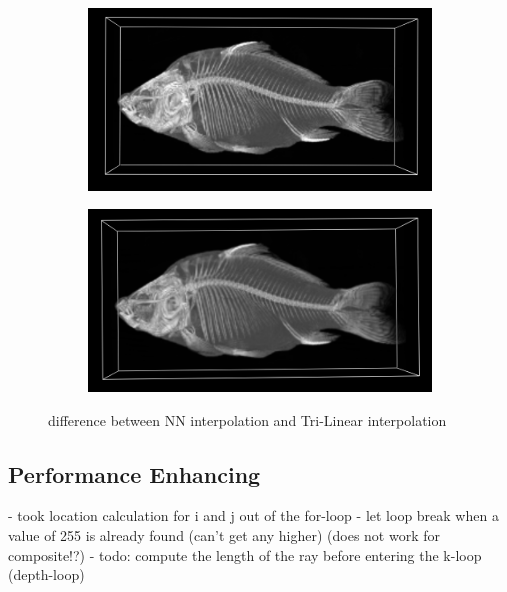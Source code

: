 \begin{figure}[h!]
    \centering
    \captionsetup{justification=centering,margin=0.5cm}
    \begin{subfigure}[t]{0.48\textwidth}
        \includegraphics[width=\textwidth]{img/fish_NN.png}
        \caption{ }
    \end{subfigure}
    \begin{subfigure}[t]{0.48\textwidth}
        \includegraphics[width=\textwidth]{img/fish_TriLin.png}
        \caption{ }
    \end{subfigure}
    \caption{difference between NN interpolation and Tri-Linear interpolation}
    \label{fig:trilinear}
\end{figure}

\subsection{Performance Enhancing}\label{sec:perf_enh}

- took location calculation for i and j out of the for-loop
- let loop break when a value of 255 is already found (can't get any higher) (does not work for composite!?)
- todo: compute the length of the ray before entering the k-loop (depth-loop) 